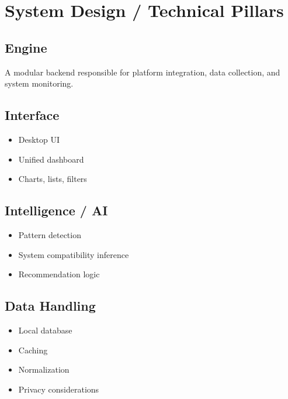 \section{System Design / Technical Pillars}
\subsection{Engine}
A modular backend responsible for platform integration, data collection, and system monitoring.

\subsection{Interface}
\begin{itemize}
  \item Desktop UI
  \item Unified dashboard
  \item Charts, lists, filters
\end{itemize}

\subsection{Intelligence / AI}
\begin{itemize}
  \item Pattern detection
  \item System compatibility inference
  \item Recommendation logic
\end{itemize}

\subsection{Data Handling}
\begin{itemize}
  \item Local database
  \item Caching
  \item Normalization
  \item Privacy considerations
\end{itemize}


